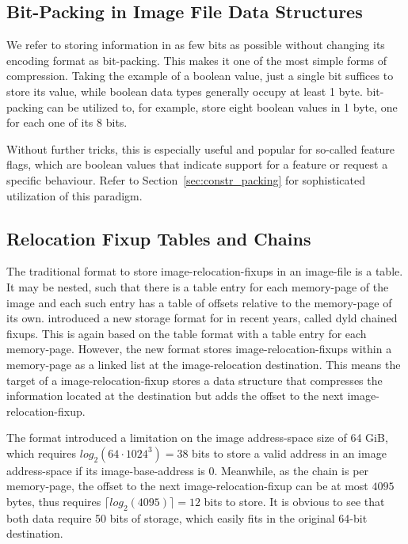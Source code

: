 \subsection{Bit-Packing in Image File Data Structures}

We refer to storing information in as few bits as possible without changing its encoding format as \gls{bit-packing}. This makes it one of the most simple forms of compression. Taking the example of a boolean value, just a single bit suffices to store its value, while boolean data types generally occupy at least 1 \gls{byte}. \Gls{bit-packing} can be utilized to, for example, store eight boolean values in 1 \gls{byte}, one for each one of its 8 bits.

Without further tricks, this is especially useful and popular for so-called feature flags, which are boolean values that indicate support for a feature or request a specific behaviour. Refer to Section~\ref{sec:constr_packing} for sophisticated utilization of this paradigm.

\subsection{Relocation Fixup Tables and Chains}

The traditional format to store \glspl{image-relocation-fixup} in an \gls{image-file} is a table. It may be nested, such that there is a table entry for each \gls{memory-page} of the \gls{image} and each such entry has a table of offsets relative to the \gls{memory-page} of its own.  introduced a new storage format for  in recent years, called dyld chained fixups. This is again based on the table format with a table entry for each \gls{memory-page}. However, the new format stores \glspl{image-relocation-fixup} within a \gls{memory-page} as a linked list at the \gls{image-relocation} destination. This means the target of a \gls{image-relocation-fixup} stores a data structure that compresses the information located at the destination but adds the offset to the next \gls{image-relocation-fixup}.

The  format introduced a limitation on the \gls{image} \gls{address-space} size of 64 GiB, which requires $log_2(64 \cdot 1024^3) = 38$ bits to store a valid address in an \gls{image} \gls{address-space} if its \gls{image-base-address} is $0$. Meanwhile, as the chain is per \gls{memory-page}, the offset to the next \gls{image-relocation-fixup} can be at most $4095$ \glspl{byte}, thus requires $\lceil log_2(4095) \rceil = 12$ bits to store. It is obvious to see that both data require 50 bits of storage, which easily fits in the original 64-bit destination.

